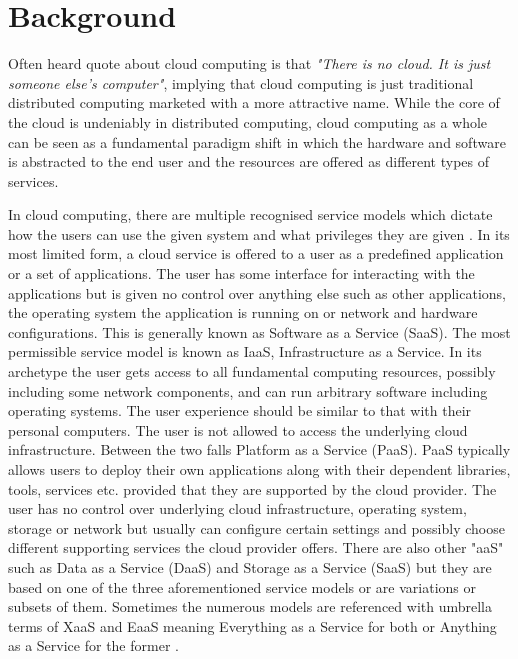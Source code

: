 \section{Background} \label{background}

Often heard quote about cloud computing is that \textit{"There is no cloud. It is just someone else's computer"}, implying that cloud computing is just traditional distributed computing marketed with a more attractive name. While the core of the cloud is undeniably in distributed computing, cloud computing as a whole can be seen as a fundamental paradigm shift in which the hardware and software is abstracted to the end user and the resources are offered as different types of services. \cite{XaaS}

In cloud computing, there are multiple recognised service models which dictate how the users can use the given system and what privileges they are given \cite{Mell:2011:SND:2206223}. In its most limited form, a cloud service is offered to a user as a predefined application or a set of applications. The user has some interface for interacting with the applications but is given no control over anything else such as other applications, the operating system the application is running on or network and hardware configurations. This is generally known as Software as a Service (SaaS). The most permissible service model is known as IaaS, Infrastructure as a Service. In its archetype the user gets access to all fundamental computing resources, possibly including some network components, and can run arbitrary software including operating systems. The user experience should be similar to that with their personal computers. The user is not allowed to access the underlying cloud infrastructure. Between the two falls Platform as a Service (PaaS). PaaS typically allows users to deploy their own applications along with their dependent libraries, tools, services etc. provided that they are supported by the cloud provider. The user has no control over underlying cloud infrastructure, operating system, storage or network but usually can configure certain settings and possibly choose different supporting services the cloud provider offers. There are also other "aaS" such as Data as a Service (DaaS) and Storage as a Service (SaaS) but they are based on one of the three aforementioned service models or are variations or subsets of them. Sometimes the numerous models are referenced with umbrella terms of XaaS and EaaS meaning Everything as a Service for both or Anything as a Service for the former \cite{XaaS}.

